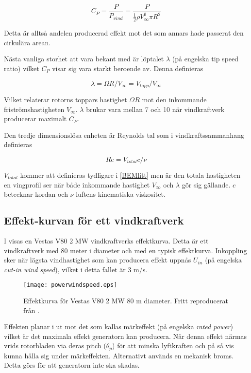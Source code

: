 \begin{equation}\label{cp} C_P =  \frac{P}{P_{vind}} = \frac{P}{\frac{1}{2}\rho V_{\infty}^{3}\pi R^2} \end{equation}

Detta är alltså andelen producerad effekt mot det som annars hade passerat den cirkulära arean.

Nästa vanliga storhet att vara bekant med är löptalet $\lambda$ (på engelska tip speed ratio) vilket $C_P$ visar sig vara starkt beroende av. Denna definieras

\begin{equation}\label{tsr} \lambda = \Omega R / V_\infty = V_{topp}/V_\infty \end{equation}

Vilket relaterar rotorns toppars hastighet $\Omega R$ mot den inkommande friströmshastigheten $V_\infty$. $\lambda$ brukar vara mellan 7 och 10 när vindkraftverk producerar maximalt $C_P$. 

Den tredje dimensionslösa enheten är Reynolds tal som i vindkraftssammanhang definieras

\begin{equation}\label{reynolds} Re = V_{total} c/\nu \end{equation}

$V_{total}$ kommer att definieras tydligare i \ref{BEMlitt} men är den totala hastigheten en vingprofil ser när både inkommande hastighet $V_\infty$ och $\lambda$ gör sig gällande. $c$ betecknar kordan och $\nu$ luftens kinematiska viskositet. 

\subsection{Effekt-kurvan för ett vindkraftverk}

I  visas en Vestas V80 2 MW vindkraftverks effektkurva. Detta är ett vindkraftverk med 80 meter i diameter och med en typisk effektkurva. Inkoppling sker när lägsta vindhastighet som kan producera effekt uppnås $U_{in}$ (på engelska \emph{cut-in wind speed}), vilket i detta fallet är 3 m/s.  

\begin{figure}[!htb]
  \centering
  \texttt{[image: powerwindspeed.eps]}
  \caption{Effektkurva för Vestas V80 2 MW 80 m diameter. Fritt reproducerat från \citet{smallwindturbines}.}
  \label{vestas}
\end{figure}

Effekten planar i  ut mot det som kallas märkeffekt (på engelska \emph{rated power}) vilket är det maximala effekt generatorn kan producera. När denna effekt närmas vrids rotorbladen via deras pitch ($\theta_p$) för att minska lyftkraften och på så vis kunna hålla sig under märkeffekten. Alternativt används en mekanisk broms. Detta görs för att generatorn inte ska skadas.

